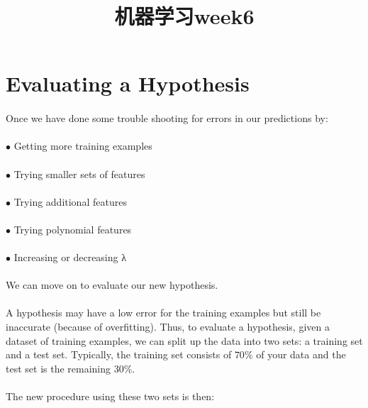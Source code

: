 \documentclass[UTF8]{ctexart}
\title{机器学习week6}
\author{  }
\date{}
\begin{document}
\maketitle
\tableofcontents

\newpage
\section{Evaluating a Hypothesis}
\paragraph{}
Once we have done some trouble shooting for errors in our predictions by:
\paragraph{}
$\bullet$ Getting more training examples
\paragraph{}
$\bullet$ Trying smaller sets of features
\paragraph{}
$\bullet$ Trying additional features
\paragraph{}
$\bullet$ Trying polynomial features
\paragraph{}
$\bullet$ Increasing or decreasing λ
\paragraph{}
We can move on to evaluate our new hypothesis.
\paragraph{}
A hypothesis may have a low error for the training examples but still be inaccurate (because of overfitting). Thus, to evaluate a hypothesis, given a dataset of training examples, we can split up the data into two sets: a training set and a test set. Typically, the training set consists of $70\%$ of your data and the test set is the remaining $30\%$.
\paragraph{}
The new procedure using these two sets is then:
\end{document}
